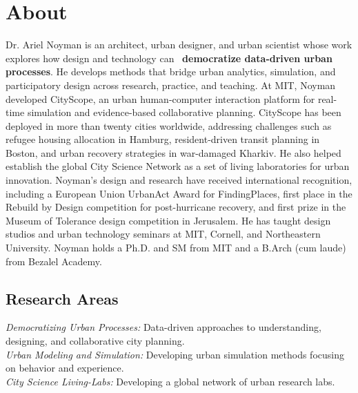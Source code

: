 \section*{About}

 {Dr. Ariel Noyman is an architect, urban designer, and urban scientist whose work explores how design and technology can ~\textbf{democratize data-driven urban processes}. He develops methods that bridge urban analytics, simulation, and participatory design across research, practice, and teaching. At MIT, Noyman developed CityScope, an urban human-computer interaction platform for real-time simulation and evidence-based collaborative planning. CityScope has been deployed in more than twenty cities worldwide, addressing challenges such as refugee housing allocation in Hamburg, resident-driven transit planning in Boston, and urban recovery strategies in war-damaged Kharkiv. He also helped establish the global City Science Network as a set of living laboratories for urban innovation. Noyman's design and research have received international recognition, including a European Union UrbanAct Award for FindingPlaces, first place in the Rebuild by Design competition for post-hurricane recovery, and first prize in the Museum of Tolerance design competition in Jerusalem. He has taught design studios and urban technology seminars at MIT, Cornell, and Northeastern University. Noyman holds a Ph.D. and SM from MIT and a B.Arch (cum laude) from Bezalel Academy.}

\subsection*{Research Areas}
\textit{Democratizing Urban Processes:} Data-driven approaches to understanding, designing, and collaborative city planning.
\\
\textit{Urban Modeling and Simulation:} Developing urban simulation methods focusing on behavior and experience.
\\
\textit{City Science Living-Labs:} Developing a global network of urban research labs.